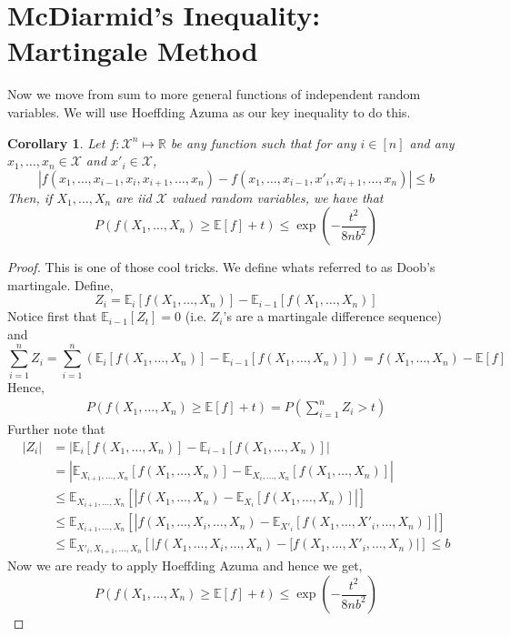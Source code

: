 \documentclass[11pt]{article}
\newcommand{\X}{\ensuremath{\mathcal{X}}}
\newcommand{\E}{\ensuremath{\mathbb{E}}}
\newcommand{\reals}{\ensuremath{\mathbb{R}}}
\newcommand{\Exp}[1]{\ensuremath{\mathbb{E}}\left[#1\right]}
\newtheorem{corollary}{Corollary}
\begin{document}
\section{McDiarmid's Inequality: Martingale Method}
Now we move from sum to more general functions of independent random variables. We will use Hoeffding Azuma as our key inequality to do this. 

\begin{corollary}
Let $f:\X^n \mapsto \reals$ be any function such that for any $i \in [n]$ and any $x_1,\ldots,x_n \in \X$ and $x'_i \in \X$, 
$$
|f(x_1,\ldots,x_{i-1},x_i,x_{i+1},\ldots,x_n) - f(x_1,\ldots,x_{i-1},x'_i,x_{i+1},\ldots,x_n)| \le b
$$
Then, if $X_1,\ldots,X_n$ are iid $\X$ valued random variables, we have that
$$
P\left(f(X_1,\ldots,X_n) \ge \Exp{f} + t\right) \le \exp\left(- \frac{t^2 }{8 n b^2} \right)
$$
\end{corollary}
\begin{proof}
This is one of those cool tricks. We define whats referred to as Doob's martingale.  Define, 
$$
Z_i = \E_{i}\left[f(X_1,\ldots,X_{n})\right] - \E_{i-1}\left[f(X_1,\ldots,X_{n})\right]
$$
Notice first that $\E_{i-1}[Z_t] = 0$ (i.e. $Z_i$'s are a martingale difference sequence) and 
$$
\sum_{i=1}^n Z_i = \sum_{i=1}^n \left(\E_{i}\left[f(X_1,\ldots,X_{n})\right] - \E_{i-1}\left[f(X_1,\ldots,X_{n})\right] \right) = f(X_1,\ldots,X_{n}) - \E\left[f\right] 
$$
Hence, 
\begin{align*}
P\left(f(X_1,\ldots,X_n) \ge \Exp{f} + t\right) = P(\sum_{i=1}^n Z_i > t)
\end{align*}
Further note that
\begin{align*}
|Z_i| &= \left| \E_{i}\left[f(X_1,\ldots,X_{n})\right] - \E_{i-1}\left[f(X_1,\ldots,X_{n})\right]\right|\\
& = \left| \E_{X_{i+1},\ldots,X_{n}}\left[f(X_1,\ldots,X_{n})\right] - \E_{X_{i},\ldots,X_{n}}\left[f(X_1,\ldots,X_{n})\right]\right|\\
& \le  \E_{X_{i+1},\ldots,X_{n}}\left[ \left|f(X_1,\ldots,X_{n}) - \E_{X_{i}}\left[f(X_1,\ldots,X_{n})\right]\right|\right]\\
& \le  \E_{X_{i+1},\ldots,X_{n}}\left[ \left|f(X_1,\ldots,X_i,\ldots,X_{n}) - \E_{X'_{i}}\left[f(X_1,\ldots,X'_i,\ldots,X_{n})\right]\right|\right]\\
& \le  \E_{X'_{i}, X_{i+1},\ldots,X_{n}}\left[ \left|f(X_1,\ldots,X_i,\ldots,X_{n}) - [f(X_1,\ldots,X'_i,\ldots,X_{n})\right|\right] \le b
\end{align*}
Now we are ready to apply Hoeffding Azuma and hence we get,
$$
P\left(f(X_1,\ldots,X_n) \ge \Exp{f} + t\right) \le \exp\left(-  \frac{t^2}{8 n b^2}\right)
$$
\end{proof}
\end{document}
